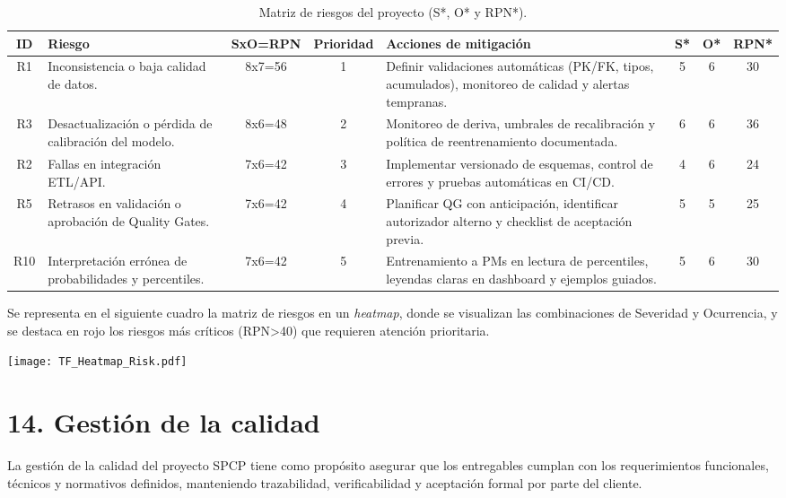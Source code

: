 \documentclass[12pt]
{charter}
\begin{document}
\begin{table}[ht]
\centering
\scriptsize
\caption{Matriz de riesgos del proyecto (S*, O* y RPN*).}
\label{tab:riesgos-RPN-residual}
\begin{tabularx}{\textwidth}{cXccXccc}
\toprule
\textbf{ID} & \textbf{Riesgo} & \textbf{SxO=RPN} & \textbf{Prioridad} & \textbf{Acciones de mitigación} & \textbf{S*} & \textbf{O*} & \textbf{RPN*}  \\
\midrule
R1 & Inconsistencia o baja calidad de datos. & 8x7=56 & 1 &
Definir validaciones automáticas (PK/FK, tipos, acumulados), monitoreo de calidad y alertas tempranas. & 5 & 6 & 30 \\
R3 & Desactualización o pérdida de calibración del modelo. & 8x6=48 & 2 &
Monitoreo de deriva, umbrales de recalibración y política de reentrenamiento documentada. & 6 & 6 & 36 \\
R2 & Fallas en integración ETL/API. & 7x6=42 & 3 & 
Implementar versionado de esquemas, control de errores y pruebas automáticas en CI/CD. & 4 & 6 & 24 \\
R5 & Retrasos en validación o aprobación de Quality Gates. & 7x6=42 & 4 &
Planificar QG con anticipación, identificar autorizador alterno y checklist de aceptación previa. & 5 & 5 & 25 \\
R10 & Interpretación errónea de probabilidades y percentiles. & 7x6=42 & 5 &
Entrenamiento a PMs en lectura de percentiles, leyendas claras en dashboard y ejemplos guiados. & 5 & 6 & 30 \\
\bottomrule
\end{tabularx}
\end{table}
\FloatBarrier

Se representa en el siguiente cuadro la matriz de riesgos en un \textit{heatmap}, donde se visualizan las combinaciones de Severidad y Ocurrencia, y se destaca en rojo los riesgos más críticos (RPN>40) que requieren atención prioritaria.

\begin{center}
  \texttt{[image: TF\_Heatmap\_Risk.pdf]}
  \label{fig:TF_Heatmap_Risk}
\end{center}
\FloatBarrier


\section{14. Gestión de la calidad}
\label{sec:calidad}

La gestión de la calidad del proyecto SPCP tiene como propósito asegurar que los entregables cumplan con los requerimientos funcionales, técnicos y normativos definidos, manteniendo trazabilidad, verificabilidad y aceptación formal por parte del cliente.  
\end{document}
